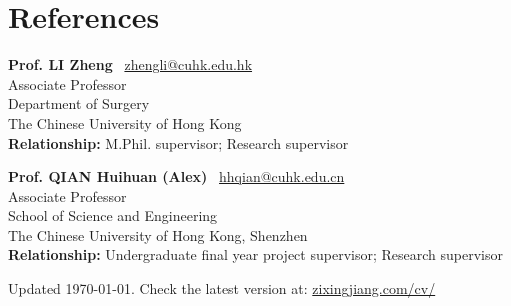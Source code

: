 \documentclass[11pt,letterpaper]{report}
\newcommand{\listitemspace}{0.25em}
\renewenvironment{itemize}
{\begin{list}{}{\setlength{\leftmargin}{0em}
			\setlength{\parskip}{0em}
			\setlength{\itemsep}{\listitemspace}
			\setlength{\parsep}{\listitemspace}}}
	{\end{list}}
\begin{document}
\section*{References}
\begin{itemize}
	\item \textbf{Prof. LI Zheng} ~{\scriptsize \faEnvelope}\href{mailto:zhengli@cuhk.edu.hk}{zhengli@cuhk.edu.hk}\\
	Associate Professor\\
	Department of Surgery\\
	The Chinese University of Hong Kong\\
	\vspace{3pt}
	\textbf{Relationship:} M.Phil. supervisor; Research supervisor

	\vspace{10pt}
	\item \textbf{Prof. QIAN Huihuan (Alex)} ~{\scriptsize \faEnvelope}\href{mailto:hhqian@cuhk.edu.cn}{hhqian@cuhk.edu.cn}\\
	Associate Professor\\School of Science and Engineering\\The Chinese University of Hong Kong, Shenzhen\\
	\vspace{3pt}
	\textbf{Relationship:} Undergraduate final year project supervisor; Research supervisor

\end{itemize}
	
\begin{center}
	\vfill
	Updated \monthyeardate\today. Check the latest version at:  \href{https://www.zixingjiang.com/cv/}{zixingjiang.com/cv/}
\end{center}
	
\end{document}
